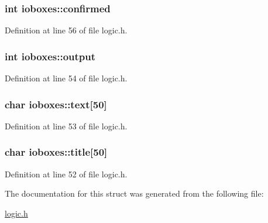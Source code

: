 \subsubsection[{confirmed}]{\setlength{\rightskip}{0pt plus 5cm}int ioboxes\+::confirmed}\label{structioboxes_a7f44b3d4da57b13490433734630c2a22}


Definition at line 56 of file logic.\+h.

\hypertarget{structioboxes_aa9f8e1e6ba24677cb35583e4b49ea9f1}{}
\subsubsection[{output}]{\setlength{\rightskip}{0pt plus 5cm}int ioboxes\+::output}\label{structioboxes_aa9f8e1e6ba24677cb35583e4b49ea9f1}


Definition at line 54 of file logic.\+h.

\hypertarget{structioboxes_aedeafb3de01e9468572e7bf9d3f55c5e}{}
\subsubsection[{text}]{\setlength{\rightskip}{0pt plus 5cm}char ioboxes\+::text\mbox{[}50\mbox{]}}\label{structioboxes_aedeafb3de01e9468572e7bf9d3f55c5e}


Definition at line 53 of file logic.\+h.

\hypertarget{structioboxes_a7200fd3d80c895bea1490cd072e0eaf4}{}
\subsubsection[{title}]{\setlength{\rightskip}{0pt plus 5cm}char ioboxes\+::title\mbox{[}50\mbox{]}}\label{structioboxes_a7200fd3d80c895bea1490cd072e0eaf4}


Definition at line 52 of file logic.\+h.



The documentation for this struct was generated from the following file\+:\begin{DoxyCompactItemize}
\item 
\hyperlink{logic_8h}{logic.\+h}\end{DoxyCompactItemize}
